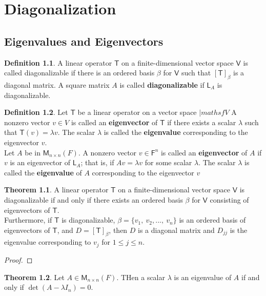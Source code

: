 \documentclass[12pt]{book}
\theoremstyle{definition}
\newtheorem{theorem}{Theorem}
\newtheorem{definition}{Definition}
\begin{document}
	\chapter{Diagonalization}
	\section*{Eigenvalues and Eigenvectors}
	\begin{definition}
		A linear operator $\mathsf{T}$ on a finite-dimensional vector space $\mathsf{V}$ is called diagonalizable if there is an ordered basis $\beta$ for $\mathsf{V}$ such that $[\mathsf{T}]_\beta$ is a diagonal matrix. A square matrix $A$ is called \textbf{diagonalizable} if $\mathsf{L}_A$ is diagonalizable.
	\end{definition}
	\newpage
	\begin{definition}
		Let $\mathsf{T}$ be a linear operator on a vector space $|mathsf{V}$ A nonzero vector $v\in V$ is called an \textbf{eigenvector} of $\mathsf{T}$ if there exists a scalar $\lambda$ such that $\mathsf{T}(v)=\lambda v$. The scalar $\lambda$ is called the \textbf{eigenvalue} corresponding to the eigenvector $v$.\\
		\indent Let $A$ be in $\mathsf{M}_{n\times n}(F)$. A nonzero vector $v\in \mathsf{F}^n$ is called an \textbf{eigenvector} of $A$ if $v$ is an eigenvector of $\mathsf{L}_A$; that is, if $Av=\lambda v$ for some scalar $\lambda$. The scalar $\lambda$ is called the \textbf{eigenvalue} of $A$ corresponding to the eigenvector $v$
	\end{definition}
	\newpage
	\begin{theorem}
		A linear operator $\mathsf{T}$ on a finite-dimensional vector space $\mathsf{V}$ is diagonalizable if and only if there exists an ordered basis $\beta$ for $\mathsf{V}$ consisting of eigenvectors of $\mathsf{T}$.\\
		\indent Furthermore, if $\mathsf{T}$ is diagonalizable, $\beta=\{v_1,\ v_2,...,\ v_n\}$ is an ordered basis of eigenvectors of $\mathsf{T}$, and $D=[\mathsf{T}]_\beta$, then $D$ is a diagonal matrix and $D_{jj}$ is the eigenvalue corresponding to $v_j$ for $1\leq j \leq n$.
	\end{theorem}
	\begin{proof}
	\end{proof}
	\newpage
	\begin{theorem}
		Let $A\in \mathsf{M}_{n\times n}(F)$. THen a scalar $\lambda$ is an eigenvalue of $A$ if and only if $\det(A-\lambda I_n)=0$.
	\end{theorem}
\end{document}
